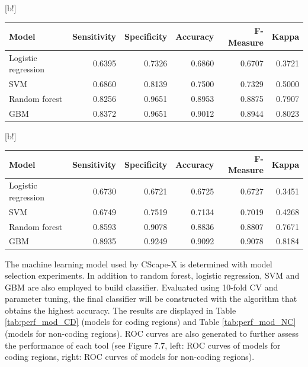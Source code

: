 \documentclass[a4paper,nohyper,nobib,openany,justified]{tufte-book}
\makeatletter
\renewenvironment{table}[1][htbp]{%
  \@tufte@orig@float{table}[#1]%
}{%
  \@tufte@orig@endfloat
}
\makeatother
\begin{document}
\begin{fullwidth}
\begin{table}[b!]
  \begin{center}
    \begin{tabular}{lrrrrr}
      \toprule
      Model & Sensitivity & Specificity & Accuracy & F-Measure & Kappa \\
      \midrule
        Logistic regression & 0.6395 & 0.7326 & 0.6860 & 0.6707 & 0.3721 \\
        SVM                 & 0.6860 & 0.8139 & 0.7500 & 0.7329 & 0.5000 \\
        Random forest       & 0.8256 & 0.9651 & 0.8953 & 0.8875 & 0.7907 \\
        GBM                 & 0.8372 & 0.9651 & 0.9012 & 0.8944 & 0.8023 \\
      \bottomrule
    \end{tabular}
  \end{center}
  \caption{Performance of three different machine learning model evaluated on test set for coding regions.}
  \label{tab:perf_mod_CD}
\end{table}

\begin{table}[b!]
  \begin{center}
    \begin{tabular}{lrrrrr}
      \toprule
      Model & Sensitivity & Specificity & Accuracy & F-Measure & Kappa \\
      \midrule
        Logistic regression & 0.6730 & 0.6721 & 0.6725 & 0.6727 & 0.3451\\
        SVM                 & 0.6749 & 0.7519 & 0.7134 & 0.7019 & 0.4268 \\
        Random forest       & 0.8593 & 0.9078 & 0.8836 & 0.8807 & 0.7671 \\
        GBM                 & 0.8935 & 0.9249 & 0.9092 & 0.9078 & 0.8184 \\
      \bottomrule
    \end{tabular}
  \end{center}
  \caption{Performance of three different machine learning model evaluated on test set for non-coding regions.}
  \label{tab:perf_mod_NC}
\end{table}

The machine learning model used by CScape-X is determined with model selection experiments. In addition to random forest, logistic regression, SVM and GBM are also employed to build classifier. Evaluated using 10-fold CV and parameter tuning, the final classifier will be constructed with the algorithm that obtains the highest accuracy. The results are displayed in Table \ref{tab:perf_mod_CD} (models for coding regions) and Table \ref{tab:perf_mod_NC} (models for non-coding regions). ROC curves are also generated to further assess the performance of each tool (see Figure 7.7, left: ROC curves of models for coding regions, right: ROC curves of models for non-coding regions).


\end{fullwidth}
\end{document}
